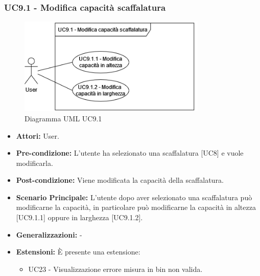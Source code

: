 \subsubsection{UC9.1 - Modifica capacità scaffalatura}
\begin{figure}[H]
  \centering
  \includegraphics[width=0.8\textwidth]{UC_diagrams_1-10/UC9.1.drawio.png}
   \caption{Diagramma UML UC9.1}
\end{figure}
\begin{itemize}
    \item \textbf{Attori:} User.
    \item \textbf{Pre-condizione:}  L'utente ha selezionato una scaffalatura [UC8] e vuole modificarla.
    \item \textbf{Post-condizione:} Viene modificata la capacità della scaffalatura.
    \item \textbf{Scenario Principale:} L'utente dopo aver selezionato una scaffalatura può modificarne la capacità, in particolare può modificarne la capacità in altezza [UC9.1.1] oppure in larghezza [UC9.1.2].
    \item \textbf{Generalizzazioni:} -
    \item \textbf{Estensioni:} È presente una estensione:
    \begin{itemize}
        \item UC23 - Visualizzazione errore misura in bin non valida.
    \end{itemize}
\end{itemize}


